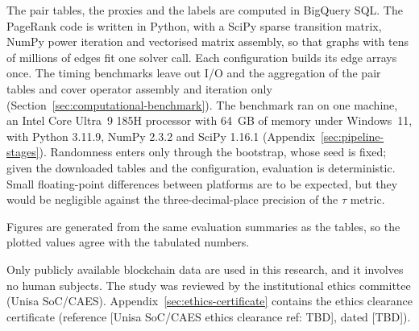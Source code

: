 
The pair tables, the proxies and the labels are computed in BigQuery SQL. The PageRank code is written in Python, with a SciPy sparse transition matrix, NumPy power iteration and vectorised matrix assembly, so that graphs with tens of millions of edges fit one solver call. Each configuration builds its edge arrays once. The timing benchmarks leave out I/O and the aggregation of the pair tables and cover operator assembly and iteration only (Section~\ref{sec:computational-benchmark}). The benchmark ran on one machine, an Intel Core Ultra~9 185H processor with 64~GB of memory under Windows~11, with Python 3.11.9, NumPy 2.3.2 and SciPy 1.16.1 (Appendix~\ref{sec:pipeline-stages}). Randomness enters only through the bootstrap, whose seed is fixed; given the downloaded tables and the configuration, evaluation is deterministic. Small floating-point differences between platforms are to be expected, but they would be negligible against the three-decimal-place precision of the $\tau$ metric.

Figures are generated from the same evaluation summaries as the tables, so the plotted values agree with the tabulated numbers.


Only publicly available blockchain data are used in this research, and it involves no human subjects. The study was reviewed by the institutional ethics committee (Unisa SoC/CAES). Appendix~\ref{sec:ethics-certificate} contains the ethics clearance certificate (reference [Unisa SoC/CAES ethics clearance ref: TBD], dated [TBD]).

